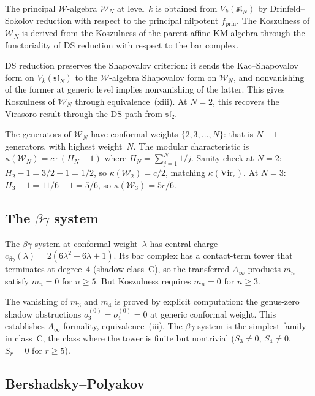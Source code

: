 \documentclass[11pt,reqno]{amsart}
\theoremstyle{definition}
\theoremstyle{remark}
\newcommand{\cW}{\mathcal{W}}
\newcommand{\Vir}{\mathrm{Vir}}
\newcommand{\Ainfty}{A_\infty}
\numberwithin{equation}{section}
\begin{document}
The principal $\cW$-algebra $\cW_N$ at level~$k$ is obtained
from $V_k(\mathfrak{sl}_N)$ by Drinfeld--Sokolov reduction with
respect to the principal nilpotent $f_{\mathrm{prin}}$. The
Koszulness of $\cW_N$ is derived from the Koszulness of the
parent affine KM algebra through the functoriality of DS
reduction with respect to the bar complex.

DS reduction preserves the Shapovalov criterion: it sends the
Kac--Shapovalov form on $V_k(\mathfrak{sl}_N)$ to the
$\cW$-algebra Shapovalov form on $\cW_N$, and nonvanishing of
the former at generic level implies nonvanishing of the latter.
This gives Koszulness of $\cW_N$ through
equivalence~(xiii). At $N = 2$, this recovers the Virasoro
result through the DS path from $\mathfrak{sl}_2$.

The generators of $\cW_N$ have conformal weights
$\{2, 3, \ldots, N\}$: that is $N - 1$ generators, with highest
weight~$N$.
The modular characteristic is
$\kappa(\cW_N) = c \cdot (H_N - 1)$
where $H_N = \sum_{j=1}^{N} 1/j$. Sanity check at $N = 2$:
$H_2 - 1 = 3/2 - 1 = 1/2$, so $\kappa(\cW_2) = c/2$,
matching $\kappa(\Vir_c)$. At $N = 3$: $H_3 - 1 = 11/6 - 1
= 5/6$, so $\kappa(\cW_3) = 5c/6$.

\subsection{The $\beta\gamma$ system}

The $\beta\gamma$ system at conformal weight~$\lambda$ has central
charge $c_{\beta\gamma}(\lambda) = 2(6\lambda^2 - 6\lambda + 1)$.
Its bar complex has a contact-term tower that terminates at
degree~$4$ (shadow class~C), so the transferred $\Ainfty$-products
$m_n$ satisfy $m_n = 0$ for $n \geq 5$. But Koszulness requires
$m_n = 0$ for $n \geq 3$.

The vanishing of $m_3$ and $m_4$ is proved by explicit computation:
the genus-zero shadow obstructions $o_3^{(0)} = o_4^{(0)} = 0$ at
generic conformal weight. This establishes $\Ainfty$-formality,
equivalence~(iii). The $\beta\gamma$ system is the simplest
family in class~C, the class where the tower is finite but
nontrivial ($S_3 \neq 0$, $S_4 \neq 0$, $S_r = 0$ for
$r \geq 5$).

\subsection{Bershadsky--Polyakov}
\end{document}
